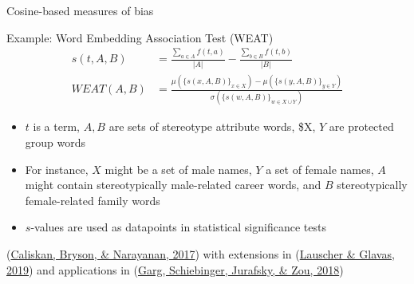 \documentclass[
  10pt,
  ignorenonframetext,
  x11names, dvipsnames, bibspacing,natbib]{beamer}
\begin{document}
\begin{frame}{Cosine-based measures of bias}
\protect\hypertarget{cosine-based-measures-of-bias-4}{}
\begin{block}{Example: Word Embedding Association Test (WEAT)}
\protect\hypertarget{example-word-embedding-association-test-weat}{}
\begin{align*}
s(t,A,B) & = \frac{\sum_{a\in A}f(t,a)}{\vert A\vert} - \frac{\sum_{b\in B}f(t,b)}{\vert B\vert}
\\
WEAT(A,B) & = \frac{
\mu\left(\{s(x,A,B)\}_{x\in X}\right) -\mu\left(\{s(y,A,B)\}_{y\in Y}\right) 
}{
\sigma\left(\{s(w,A,B)\}_{w\in X\cup Y}\right)
}
\end{align*}

\begin{itemize}
\item
  \(t\) is a term, \(A, B\) are sets of stereotype attribute words, \$X,
  \(Y\) are protected group words
\item
  For instance, \(X\) might be a set of male names, \(Y\) a set of
  female names, \(A\) might contain stereotypically male-related career
  words, and \(B\) stereotypically female-related family words
\item
  \(s\)-values are used as datapoints in statistical significance tests
\end{itemize}

\footnotesize

(\protect\hyperlink{ref-Caliskan2017semanticsBiases}{Caliskan, Bryson,
\& Narayanan, 2017}) with extensions in
(\protect\hyperlink{ref-Lauscher2019multidimensional}{Lauscher \&
Glavas, 2019}) and applications in
(\protect\hyperlink{ref-Garg2018years}{Garg, Schiebinger, Jurafsky, \&
Zou, 2018})
\end{block}
\end{frame}
\end{document}
